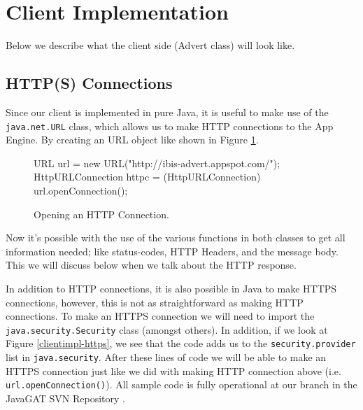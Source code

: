 \section{Client Implementation}
Below we describe what the client side (Advert class) will look like.

\subsection{HTTP(S) Connections}
Since our client is implemented in pure Java, it is useful to make use of the
\texttt{java.net.URL} class, which allows us to make HTTP connections to the
App Engine. By creating an URL object like shown in Figure \ref{clientimpl-url}.

\begin{figure}[ht] %
\begin{center}
\begin{code}
URL url = new URL("http://ibis-advert.appspot.com/");
HttpURLConnection httpc = (HttpURLConnection) url.openConnection();
\end{code}
\caption{Opening an HTTP Connection.\label{clientimpl-url}}
\end{center}
\end{figure}

Now it's possible with the use of the various functions in both classes to get
all information needed; like status-codes, HTTP Headers, and the message body.
This we will discuss below when we talk about the HTTP response.

In addition to HTTP connections, it is also possible in Java to make HTTPS
connections, however, this is not as straightforward as making HTTP connections.
To make an HTTPS connection we will need to import the
\texttt{java.security.Security} class (amongst others). In addition, if we look
at Figure \ref{clientimpl-https}, we see that the code adds us to the
\texttt{security.provider} list in \texttt{java.security}. After these lines of
code we will be able to make an HTTPS connection just like we did with making
HTTP connection above (i.e. \texttt{url.openConnection()}). All sample code is
fully operational at our branch in the JavaGAT SVN Repository .


